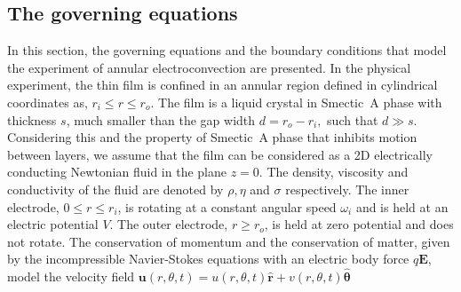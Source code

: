 \subsection{The governing equations}\label{sec_gov_equ}
In this section, the governing equations and the boundary conditions that model the experiment of annular electroconvection are presented. In the physical experiment, the thin film is confined in an annular region defined in cylindrical coordinates as, $r_i\le r\le r_o$. The film is a liquid crystal in Smectic~A phase with thickness $s$,  much smaller than the gap width $d = r_o-r_i,$ such that $d\gg s$. Considering this and the property of Smectic~A phase that inhibits motion between layers, we assume that the film can be considered as a 2D electrically conducting Newtonian fluid in the plane $z=0$. The density, viscosity and conductivity of the fluid are denoted by $\rho, \eta$ and $\sigma$ respectively. The inner electrode, $0\le r\le r_i$, is rotating at a constant angular speed $\omega_i$ and is held at an electric potential $V$. The outer electrode, $ r\ge r_o$, is held at zero potential and does not rotate. The conservation of momentum and the conservation of matter, given by the incompressible Navier-Stokes equations with an electric body force $q\mathbf{E}$, model the velocity field $\mathbf{u}(r,\theta,t) = u(r,\theta,t) \hat{\mathbf{r}} + v(r,\theta,t) \boldsymbol{\hat{\theta}}$
